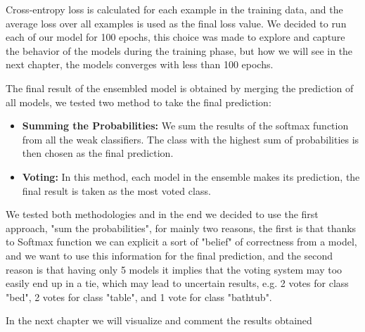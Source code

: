 Cross-entropy loss is calculated for each example in the training data, and the average loss over all examples is used as the final loss value.
We decided to run each of our model for 100 epochs, this choice was made to explore and capture the behavior of the models during the training phase, but how we will see in the next chapter, the models converges with less than 100 epochs.

The final result of the ensembled model is obtained by merging the prediction of all models, we tested two method to take the final prediction:
\begin{itemize}
    \item \textbf{Summing the Probabilities:} We sum the results of the softmax function from all the weak classifiers. The class with the highest sum of probabilities is then chosen as the final prediction. 
    \item \textbf{Voting:} In this method, each model in the ensemble makes its prediction, the final result is taken as the most voted class. 
\end{itemize}
    We tested both methodologies and in the end we decided to use the first approach, "sum the probabilities", for mainly two reasons, the first is that thanks to Softmax function we can explicit a sort of "belief" of correctness from a model, and we want to use this information for the final prediction, and the second reason is that having only 5 models it implies that the voting system may too easily end up in a tie, which may lead to uncertain results, e.g. 2 votes for class "bed", 2 votes for class "table", and 1 vote for class "bathtub". 
    
In the next chapter we will visualize and comment the results obtained
